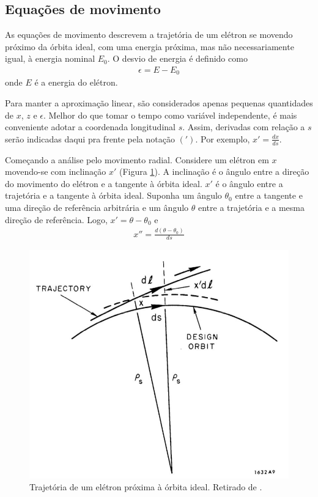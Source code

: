 \subsection{Equações de movimento}\label{sec:3.2}
As equações de movimento descrevem a trajetória de um elétron se movendo próximo da órbita ideal, com uma energia próxima, mas não necessariamente igual, à energia nominal $E_0$. O desvio de energia é definido como
\begin{align}
	\epsilon = E-E_0
\end{align}
onde $E$ é a energia do elétron.

Para manter a aproximação linear, são considerados apenas pequenas quantidades de $x$, $z$ e $\epsilon$. Melhor do que tomar o tempo como variável independente, é mais conveniente adotar a coordenada longitudinal $s$. Assim, derivadas com relação a $s$ serão indicadas daqui pra frente pela notação $(')$. Por exemplo, $x'=\frac{dx}{ds}$.

Começando a análise pelo movimento radial. Considere um elétron em $x$ movendo-se com inclinação $x'$ (Figura \ref{fig:fig9}). A inclinação é o ângulo entre a direção do movimento do elétron e a tangente à órbita ideal. $x'$ é o ângulo entre a trajetória e a tangente à órbita ideal. Suponha um ângulo $\theta_0$ entre a tangente e uma direção de referência arbitrária e um ângulo $\theta$ entre a trajetória e a mesma direção de referência. Logo, $x' = \theta-\theta_0$ e
\begin{align}
	x'' = \frac{d(\theta-\theta_0)}{ds}\label{eq:2.12}
\end{align}

\begin{figure}[!htb]
	\centering
	\includegraphics[width=0.6\linewidth]{./Figuras/fig9.jpeg}
	\caption{Trajetória de um elétron próxima à órbita ideal. Retirado de \cite{sands1970physics}.}
	\label{fig:fig9}
\end{figure}

